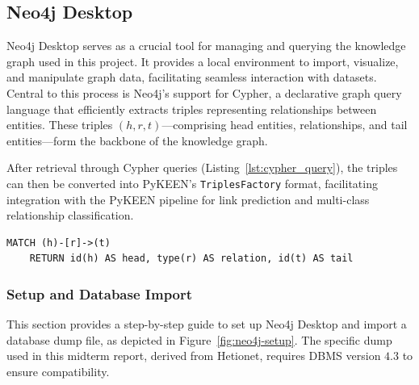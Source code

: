 \subsection*{Neo4j Desktop}

Neo4j Desktop \cite{neo4j} serves as a crucial tool for managing and querying the knowledge graph used in this project.
It provides a local environment to import, visualize, and manipulate graph data, facilitating seamless interaction with datasets.
Central to this process is Neo4j's support for Cypher, a declarative graph query language that efficiently extracts triples representing relationships between entities.
These triples $(h, r, t)$---comprising head entities, relationships, and tail entities---form the backbone of the knowledge graph.

After retrieval through Cypher queries (Listing~\ref{lst:cypher_query}), the triples can then be converted into PyKEEN's \texttt{TriplesFactory} format, facilitating integration with the PyKEEN pipeline for link prediction and multi-class relationship classification.

\begin{lstlisting}[caption=Cypher query to retrieve triples., label=lst:cypher_query]
    MATCH (h)-[r]->(t)
    RETURN id(h) AS head, type(r) AS relation, id(t) AS tail
\end{lstlisting}

\subsubsection*{Setup and Database Import}

This section provides a step-by-step guide to set up Neo4j Desktop and import a database dump file, as depicted in Figure~\ref{fig:neo4j-setup}. The specific dump used in this midterm report, derived from Hetionet, requires DBMS version $4.3$ to ensure compatibility.


